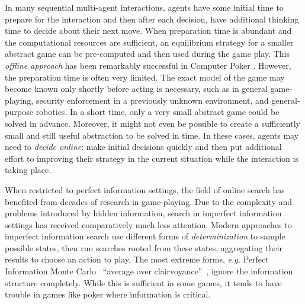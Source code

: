 \documentclass[letterpaper]{article}
\newcommand{\eg}{{\it e.g.}\xspace}
\begin{document}
In many sequential multi-agent interactions, agents have some initial time to prepare for the interaction and then after each decision, have  additional thinking time to decide about their next move. When preparation time is abundant and the computational resources are sufficient, an equilibrium strategy for a smaller abstract game can be pre-computed and then used during the game play. This {\it offline approach} has been remarkably successful in Computer Poker \cite{Johanson07Msc,Sandholm10The}.
However, the preparation time is often very limited. The exact model of the game may become known only shortly before acting is necessary, such as in general game-playing, security enforcement in a previously unknown environment, and general-purpose robotics. In a short time, only a very small abstract game could be solved in advance. Moreover, it might not even be possible to create a sufficiently small and still useful abstraction to be solved in time. In these cases, agents may need to {\it decide online}: make initial decisions quickly and then put additional effort to improving their strategy in the current situation while the interaction is taking place.

When restricted to perfect information settings, the field of online search has benefited from decades of research in game-playing. 
Due to the complexity and problems introduced by hidden information, search in imperfect information settings has received comparatively much less attention.
Modern approaches to imperfect information search use different forms of {\it determinization} to sample possible states, then run 
searches rooted from these states, aggregating their results to choose an action to play. The most extreme forms, \eg Perfect Information 
Monte Carlo~\cite{Long10Understanding} ``average over clairvoyance''~\cite{AIBook},
ignore the information structure completely. While this is sufficient in some games, it tends to have trouble in games like poker 
where information is critical.

\end{document}
